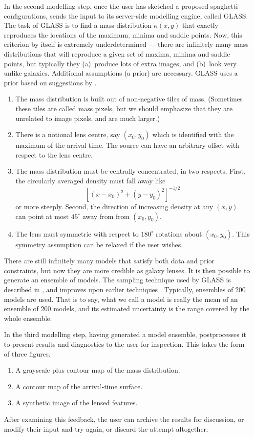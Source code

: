 In the second modelling step, once the user has sketched a proposed
spaghetti configurations, \spl sends the input to its server-side
modelling engine, called GLASS.  The task of GLASS is to find a mass
distribution $\kappa(x,y)$ that exactly reproduces the locations of
the maximum, minima and saddle points.  Now, this criterion by itself
is extremely underdetermined --- there are infinitely many mass
distributions that will reproduce a given set of maxima, minima and
saddle points, but typically they (a)~produce lots of extra images,
and (b)~look very unlike galaxies.  Additional assumptions (a prior)
are necessary.  GLASS uses a prior based on suggestions by
\cite{1997MNRAS.292..148S}.
\begin{enumerate}
\item The mass distribution is built out of non-negative tiles of
  mass.  (Sometimes these tiles are called mass pixels, but we should
  emphasize that they are unrelated to image pixels, and are much
  larger.)
\item There is a notional lens centre, say $(x_0,y_0)$ which is
  identified with the maximum of the arrival time.  The source can
  have an arbitrary offset with respect to the lens centre.
\item The mass distribution must be centrally concentrated, in two
  respects.  First, the circularly averaged density must fall away
  like $$ \left[(x-x_0)^2+(y-y_0)^2\right]^{-1/2}$$ or more steeply.
  Second, the direction of increasing density at any $(x,y)$ can point
  at most $45^\circ$ away from from $(x_0,y_0)$.
\item The lens must symmetric with respect to $180^\circ$ rotations
  about $(x_0,y_0)$.  This symmetry assumption can be relaxed if the
  user wishes.
\end{enumerate}
There are still infinitely many models that satisfy both data and
prior constraints, but now they are more credible as galaxy lenses.
It is then possible to generate an ensemble of models.  The sampling
technique used by GLASS is described in \citep{Lubini2012}, and
improves upon earlier techniques \citep{2000AJ....119..439W,Saha2004}.
Typically, ensembles of 200 models are used.  That is to say, what we
call a \spl model is really the mean of an ensemble of 200 models, and
its estimated uncertainty is the range covered by the whole ensemble.

In the third modelling step, having generated a model ensemble, \spl
postprocesses it to present results and diagnostics to the user for
inspection.  This takes the form of three figures.
\begin{enumerate}
\item A grayscale plus contour map of the mass distribution.
\item A contour map of the arrival-time surface.
\item A synthetic image of the lensed features.
\end{enumerate}
After examining this feedback, the user can archive the results for
discussion, or modify their input and try again, or discard the
attempt altogether.

